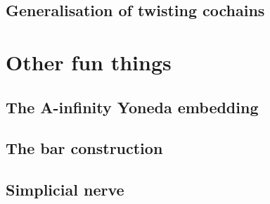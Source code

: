 \documentclass{beamer}
\begin{document}
        \subsection{Generalisation of twisting cochains}
    

    \section{Other fun things}

        \subsection{The A-infinity Yoneda embedding}
        
        \subsection{The bar construction}
        
        \subsection{Simplicial nerve}
\end{document}
